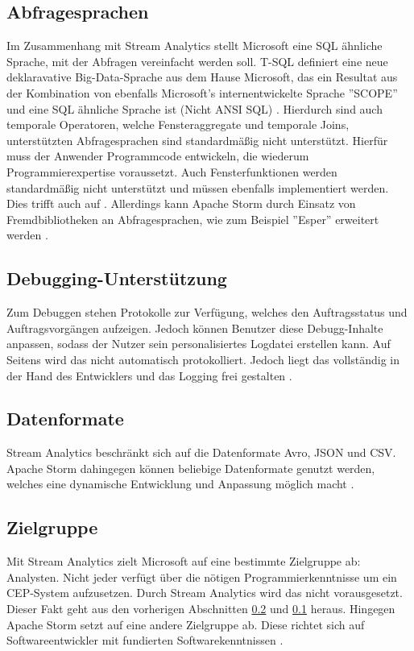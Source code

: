 \subsection{Abfragesprachen} \label{absprache}
Im Zusammenhang mit Stream Analytics stellt Microsoft eine SQL ähnliche Sprache, mit der Abfragen vereinfacht werden soll. T-SQL definiert eine neue deklaravative Big-Data-Sprache aus dem Hause Microsoft, das ein Resultat aus der Kombination von ebenfalls Microsoft’s internentwickelte Sprache ''SCOPE'' und eine SQL ähnliche Sprache ist (Nicht ANSI SQL) \cite{sql.2016}. Hierdurch sind auch temporale Operatoren, welche Fensteraggregate und temporale Joins, unterstützten  Abfragesprachen sind standardmäßig nicht unterstützt. Hierfür muss der Anwender Programmcode entwickeln, die wiederum Programmierexpertise voraussetzt. Auch Fensterfunktionen werden standardmäßig nicht unterstützt und müssen ebenfalls implementiert werden. Dies trifft auch auf  \cite{samacha.2017}. Allerdings kann Apache Storm durch Einsatz von Fremdbibliotheken an Abfragesprachen, wie zum Beispiel ''Esper'' erweitert werden \cite{esper.2016}.

\subsection{Debugging-Unterstützung} \label{Debugging}
Zum Debuggen stehen Protokolle zur Verfügung, welches den Auftragsstatus und Auftragsvorgängen aufzeigen. Jedoch können Benutzer diese Debugg-Inhalte anpassen, sodass der Nutzer sein personalisiertes Logdatei erstellen kann. Auf Seitens wird das nicht automatisch protokolliert. Jedoch liegt das vollständig in der Hand des Entwicklers und das Logging frei gestalten \cite{apachedebugging.2106}.


\subsection{Datenformate}
Stream Analytics beschränkt sich auf die Datenformate Avro, JSON und CSV. Apache Storm dahingegen können beliebige Datenformate genutzt werden, welches eine dynamische Entwicklung und Anpassung möglich macht \cite{Klein.2017}. 

\subsection{Zielgruppe}
Mit Stream Analytics zielt Microsoft auf eine bestimmte Zielgruppe ab: Analysten. Nicht jeder verfügt über die nötigen Programmierkenntnisse um ein CEP-System aufzusetzen. Durch Stream Analytics wird das nicht vorausgesetzt. Dieser Fakt geht aus den vorherigen Abschnitten \ref{Debugging} und \ref{absprache} heraus. Hingegen Apache Storm setzt auf eine andere Zielgruppe ab. Diese richtet sich auf Softwareentwickler mit fundierten Softwarekenntnissen \cite{Familiar.2017}. 
